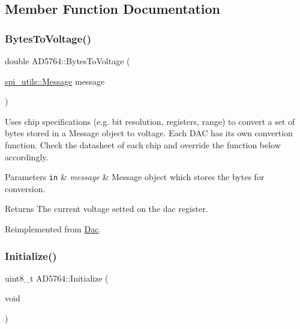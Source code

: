 \subsection{Member Function Documentation}
\mbox{\label{classAD5764_a729015992eda059ae615373d1db53823}} 
\subsubsection{\texorpdfstring{Bytes\+To\+Voltage()}{BytesToVoltage()}}
{\footnotesize\ttfamily double A\+D5764\+::\+Bytes\+To\+Voltage (\begin{DoxyParamCaption}\item[{\mbox{\hyperlink{structspi__utils_1_1Message}{spi\+\_\+utils\+::\+Message}}}]{message }\end{DoxyParamCaption})\hspace{0.3cm}{\ttfamily [virtual]}}

Uses chip specifications (e.\+g. bit resolution, registers, range) to convert a set of bytes stored in a Message object to voltage. Each D\+AC has its own convertion function. Check the datasheet of each chip and override the function below accordingly. 
\begin{DoxyParams}[1]{Parameters}
\mbox{\tt in}  & {\em message} & Message object which stores the bytes for conversion. \\
\hline
\end{DoxyParams}
\begin{DoxyReturn}{Returns}
The current voltage setted on the dac register. 
\end{DoxyReturn}


Reimplemented from \mbox{\hyperlink{classDac_a2dc7bd90fddf1e38af8f18a0191ce840}{Dac}}.

\mbox{\label{classAD5764_ab98c5418cf46198dd4b967e143896a3a}} 
\subsubsection{\texorpdfstring{Initialize()}{Initialize()}}
{\footnotesize\ttfamily uint8\+\_\+t A\+D5764\+::\+Initialize (\begin{DoxyParamCaption}\item[{void}]{ }\end{DoxyParamCaption})\hspace{0.3cm}{\ttfamily [inline]}}

